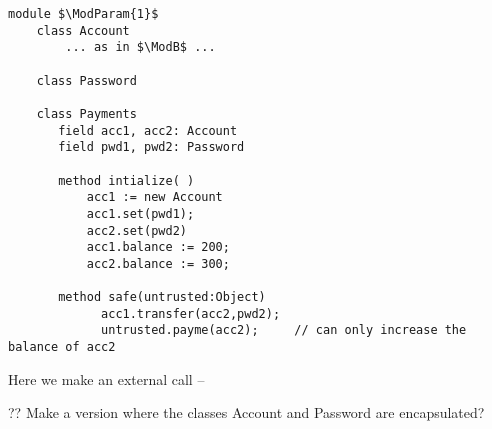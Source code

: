 \begin{lstlisting}[mathescape=true, language=chainmail, frame=lines]
module $\ModParam{1}$
    class Account 
        ... as in $\ModB$ ...
        
    class Password
    
    class Payments
       field acc1, acc2: Account
       field pwd1, pwd2: Password
       
       method intialize( )
           acc1 := new Account
           acc1.set(pwd1);
           acc2.set(pwd2)
           acc1.balance := 200;
           acc2.balance := 300;
          
       method safe(untrusted:Object)
             acc1.transfer(acc2,pwd2);
             untrusted.payme(acc2);     // can only increase the balance of acc2

\end{lstlisting}
 
 
 Here we make an external call --    
 
 ?? Make a version where the classes Account and Password are encapsulated?

%
% 
 

